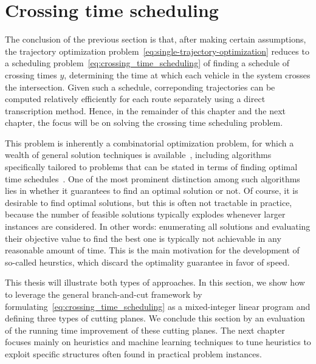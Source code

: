 \documentclass[a4paper]{report}
\newcommand{\comment}[1]{\pdfmargincomment[author=Jeroen van Riel]{#1}}
\theoremstyle{definition}
\theoremstyle{plain}
\begin{document}
\section{Crossing time scheduling}\label{sec:crossing-time-scheduling}

The conclusion of the previous section is that, after making certain
assumptions, the trajectory optimization problem~\eqref{eq:single-trajectory-optimization} reduces to a scheduling
problem~\eqref{eq:crossing_time_scheduling} of finding a schedule of crossing times $y$, determining the time at
which each vehicle in the system crosses the intersection.
%
Given such a schedule, correponding trajectories can be computed relatively
efficiently for each route separately using a direct transcription method.
%
Hence, in the remainder of this chapter and the next chapter, the focus will be
on solving the crossing time scheduling problem.

This problem is inherently a combinatorial optimization problem, for which a
wealth of general solution techniques is
available~\cite{duIntroductionCombinatorialOptimization2022}, including
algorithms specifically tailored to problems that can be stated in terms of
finding optimal time
schedules~\cite{pinedoSchedulingTheoryAlgorithms2016,grahamOptimizationApproximationDeterministic1979}.
%
One of the most prominent distinction among such algorithms lies in whether it
guarantees to find an optimal solution or not.
%
Of course, it is desirable to find optimal solutions, but this is often not
tractable in practice, because the number of feasible solutions typically
explodes whenever larger instances are considered.
%
In other words: enumerating all solutions and evaluating their objective value
to find the best one is typically not achievable in any reasonable amount of
time.
%
This is the main motivation for the development of so-called heurstics, which
discard the optimality guarantee in favor of speed.

This thesis will illustrate both types of approaches.
%
In this section, we show how to leverage the general branch-and-cut framework by
formulating~\eqref{eq:crossing_time_scheduling} as a mixed-integer linear
program and defining three types of cutting planes.
%
We conclude this section by an evaluation of the running time improvement of
these cutting planes. \comment{Clearly motivate why we want fast heuristics.}
%
The next chapter focuses mainly on heuristics and machine learning techniques to
tune heuristics to exploit specific structures often found in practical problem
instances.
\end{document}

